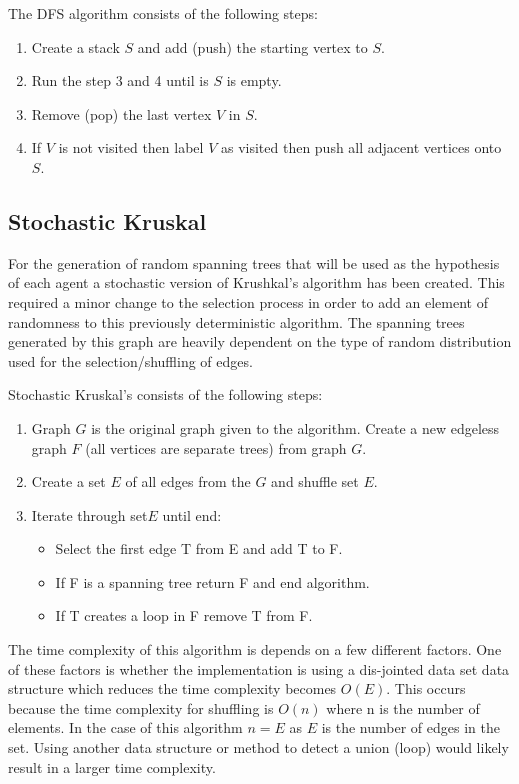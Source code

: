 \documentclass{AISB2008}
\begin{document}
The DFS algorithm consists of the following steps:

\begin{enumerate}
\item Create a stack {$S$} and add (push) the starting vertex to {$S$}.
\item Run the step 3 and 4 until is {$S$} is empty.
\item Remove (pop) the last vertex {$V$} in {$S$}.
\item If {$V$} is not visited then label {$V$} as visited then push all adjacent vertices onto {$S$}.
\end{enumerate}


\subsection{Stochastic Kruskal}

For the generation of random spanning trees that will be used as the hypothesis of each agent a stochastic version of Krushkal’s algorithm has been created. This required a minor change to the selection process in order to add an element of randomness to this previously deterministic algorithm. The spanning trees generated by this graph are heavily dependent on the type of random distribution used for the selection/shuffling of edges.

Stochastic Kruskal’s consists of the following steps:

\begin{enumerate}
\item Graph {$G$} is the original graph given to the algorithm. Create a new edgeless graph {$F$} (all vertices are separate trees) from graph {$G$}.
\item Create a set {$E$} of all edges from the {$G$} and shuffle set {$E$}.
\item Iterate through set{$E$} until end:
\begin{itemize}
\item Select the first edge T from E and add T to F.
\item If F is a spanning tree return F and end algorithm.
\item If T creates a loop in F remove T from F.
\end{itemize}
\end{enumerate}

The time complexity of this algorithm is depends on a few different factors. One of these factors is whether the implementation is using a dis-jointed data set data structure which reduces the time complexity becomes {$O (E)$}. This occurs because the time complexity for shuffling is {$O (n)$} where n is the number of elements. In the case of this algorithm {$n = E$} as {$E$} is the number of edges in the set. Using another data structure or method to detect a union (loop) would likely result in a larger time complexity. 
\end{document}
